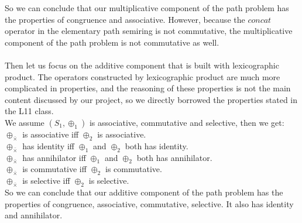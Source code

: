 \documentclass[a4paper,10pt]{article}
\begin{document}
So we can conclude that our multiplicative component of the path problem has the properties of congruence and associative. However, because the $concat$ operator in the elementary path semiring is not commutative, the multiplicative component of the path problem is not commutative as well.\\\\
Then let us focus on the additive component that is built with lexicographic product. 
The operators constructed by lexicographic product are much more complicated in properties, and the reasoning of these properties is not the main content discussed by our project, so we directly borrowed the properties stated in the L11 class.\\
We assume $(S_1,\oplus_1)$ is associative, commutative and selective, then we get:\\
$\oplus_{\bar{\times}}$ is associative iff $\oplus_2$ is associative.\\
$\oplus_{\bar{\times}}$ has identity iff $\oplus_1$ and $\oplus_2$ both has identity.\\
$\oplus_{\bar{\times}}$ has annihilator iff $\oplus_1$ and $\oplus_2$ both has annihilator.\\
$\oplus_{\bar{\times}}$ is commutative iff $\oplus_2$ is commutative.\\
$\oplus_{\bar{\times}}$ is selective iff $\oplus_2$ is selective.\\
So we can conclude that our additive component of the path problem has the properties of congruence, associative, commutative, selective. It also has identity and annihilator.\\
\end{document}
